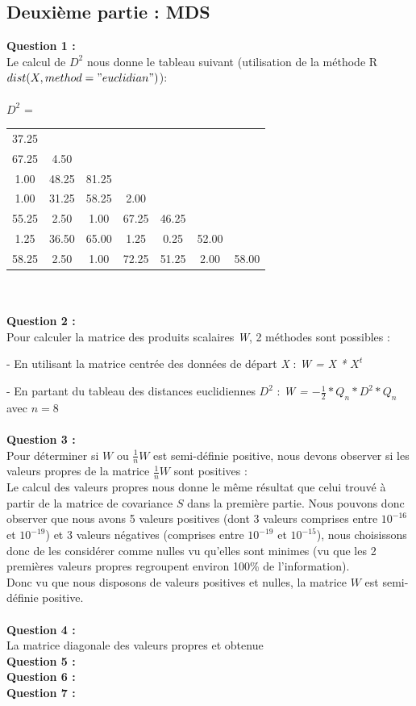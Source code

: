 \documentclass[a4paper, 10pt]{article}
\begin{document}
\subsection*{Deuxième partie : MDS}
\textbf{Question 1 :}\\
Le calcul de \textit{$D^{2}$} nous donne le tableau suivant (utilisation de la méthode R $dist(X, method = "euclidian")$):\\ \\
$D^{2}$ = 
\begin{tabular}{|ccccccc|}
37.25 & & & & & & \\
67.25 & 4.50 & & & & & \\
1.00 & 48.25 & 81.25 & & & & \\
1.00 & 31.25 & 58.25 & 2.00 & & & \\
55.25 & 2.50 & 1.00 & 67.25 & 46.25 & & \\
1.25 & 36.50 & 65.00 & 1.25 & 0.25 & 52.00 & \\
58.25 & 2.50 & 1.00 & 72.25 & 51.25 & 2.00 & 58.00 \\
\end{tabular}\\ \\
\textbf{Question 2 :}\\
Pour calculer la matrice des produits scalaires \textit{W}, 2 méthodes sont possibles :

- En utilisant la matrice centrée des données de départ \textit{X} : \textit{W = X * $X^{t}$}

- En partant du tableau des distances euclidiennes \textit{$D^{2}$} : \textit{W = $-\frac{1}{2} * Q_{n} * D^{2} * Q_{n}$} avec $n = 8$\\ \\
\textbf{Question 3 :}\\
Pour déterminer si $W$ ou $\frac{1}{n}W$ est semi-définie positive, nous devons observer si les valeurs propres de la matrice $\frac{1}{n}W$
sont positives :\\
Le calcul des valeurs propres nous donne le même résultat que celui trouvé à partir de la matrice de covariance $S$ dans la première partie.
Nous pouvons donc observer que nous avons 5 valeurs positives (dont 3 valeurs comprises entre $10^{-16}$ et $10^{-19}$) et
3 valeurs négatives (comprises entre $10^{-19}$ et $10^{-15}$), nous choisissons donc de les considérer comme nulles vu qu'elles sont minimes
(vu que les 2 premières valeurs propres regroupent environ 100\% de l'information).\\
Donc vu que nous disposons de valeurs positives et nulles, la matrice $W$ est semi-définie positive.\\ \\
\textbf{Question 4 :}\\
La matrice diagonale des valeurs propres et obtenue\\
\textbf{Question 5 :}\\
\textbf{Question 6 :}\\
\textbf{Question 7 :}\\
\end{document}
